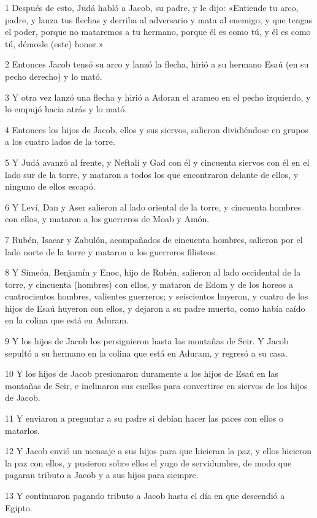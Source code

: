 \par 1 Después de esto, Judá habló a Jacob, su padre, y le dijo: «Entiende tu arco, padre, y lanza tus flechas y derriba al adversario y mata al enemigo; y que tengas el poder, porque no mataremos a tu hermano, porque él es como tú, y él es como tú, démosle (este) honor.»
\par 2 Entonces Jacob tensó su arco y lanzó la flecha, hirió a su hermano Esaú (en su pecho derecho) y lo mató.
\par 3 Y otra vez lanzó una flecha y hirió a Adoran el arameo en el pecho izquierdo, y lo empujó hacia atrás y lo mató.
\par 4 Entonces los hijos de Jacob, ellos y sus siervos, salieron dividiéndose en grupos a los cuatro lados de la torre.
\par 5 Y Judá avanzó al frente, y Neftalí y Gad con él y cincuenta siervos con él en el lado sur de la torre, y mataron a todos los que encontraron delante de ellos, y ninguno de ellos escapó.
\par 6 Y Leví, Dan y Aser salieron al lado oriental de la torre, y cincuenta hombres con ellos, y mataron a los guerreros de Moab y Amón.
\par 7 Rubén, Isacar y Zabulón, acompañados de cincuenta hombres, salieron por el lado norte de la torre y mataron a los guerreros filisteos.
\par 8 Y Simeón, Benjamín y Enoc, hijo de Rubén, salieron al lado occidental de la torre, y cincuenta (hombres) con ellos, y mataron de Edom y de los horeos a cuatrocientos hombres, valientes guerreros; y seiscientos huyeron, y cuatro de los hijos de Esaú huyeron con ellos, y dejaron a su padre muerto, como había caído en la colina que está en Aduram.
\par 9 Y los hijos de Jacob los persiguieron hasta las montañas de Seir. Y Jacob sepultó a su hermano en la colina que está en Aduram, y regresó a su casa.
\par 10 Y los hijos de Jacob presionaron duramente a los hijos de Esaú en las montañas de Seir, e inclinaron sus cuellos para convertirse en siervos de los hijos de Jacob.
\par 11 Y enviaron a preguntar a su padre si debían hacer las paces con ellos o matarlos.
\par 12 Y Jacob envió un mensaje a sus hijos para que hicieran la paz, y ellos hicieron la paz con ellos, y pusieron sobre ellos el yugo de servidumbre, de modo que pagaran tributo a Jacob y a sus hijos para siempre.
\par 13 Y continuaron pagando tributo a Jacob hasta el día en que descendió a Egipto.
